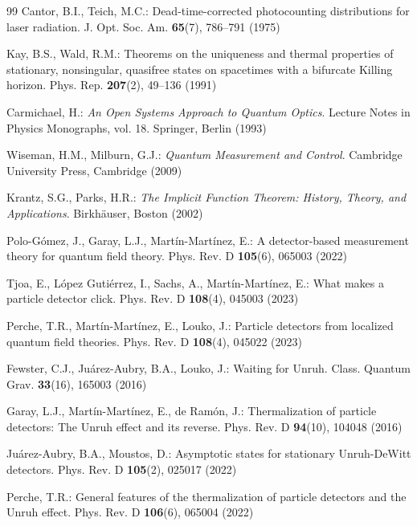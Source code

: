 \begin{thebibliography}{99}
Cantor, B.I., Teich, M.C.: Dead-time-corrected photocounting distributions for laser radiation. J. Opt. Soc. Am. \textbf{65}(7), 786--791 (1975)

Kay, B.S., Wald, R.M.: Theorems on the uniqueness and thermal properties of stationary, nonsingular, quasifree states on spacetimes with a bifurcate Killing horizon. Phys. Rep. \textbf{207}(2), 49--136 (1991)

Carmichael, H.: \emph{An Open Systems Approach to Quantum Optics}. Lecture Notes in Physics Monographs, vol. 18. Springer, Berlin (1993)

Wiseman, H.M., Milburn, G.J.: \emph{Quantum Measurement and Control}. Cambridge University Press, Cambridge (2009)

Krantz, S.G., Parks, H.R.: \emph{The Implicit Function Theorem: History, Theory, and Applications}. Birkh\"auser, Boston (2002)

Polo-G\'omez, J., Garay, L.J., Mart\'in-Mart\'inez, E.: A detector-based measurement theory for quantum field theory. Phys. Rev. D \textbf{105}(6), 065003 (2022)

Tjoa, E., L\'opez Guti\'errez, I., Sachs, A., Mart\'in-Mart\'inez, E.: What makes a particle detector click. Phys. Rev. D \textbf{108}(4), 045003 (2023)

Perche, T.R., Mart\'in-Mart\'inez, E., Louko, J.: Particle detectors from localized quantum field theories. Phys. Rev. D \textbf{108}(4), 045022 (2023)

Fewster, C.J., Ju\'arez-Aubry, B.A., Louko, J.: Waiting for Unruh. Class. Quantum Grav. \textbf{33}(16), 165003 (2016)

Garay, L.J., Mart\'in-Mart\'inez, E., de Ram\'on, J.: Thermalization of particle detectors: The Unruh effect and its reverse. Phys. Rev. D \textbf{94}(10), 104048 (2016)

Ju\'arez-Aubry, B.A., Moustos, D.: Asymptotic states for stationary Unruh-DeWitt detectors. Phys. Rev. D \textbf{105}(2), 025017 (2022)

Perche, T.R.: General features of the thermalization of particle detectors and the Unruh effect. Phys. Rev. D \textbf{106}(6), 065004 (2022)


\end{thebibliography}
